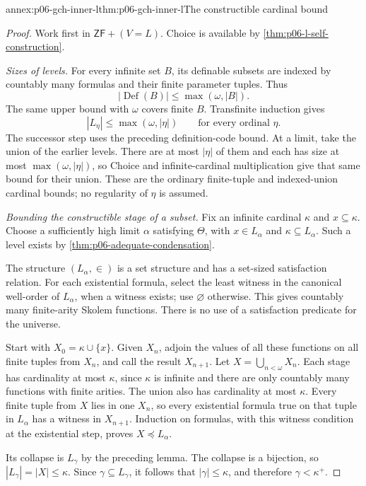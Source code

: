 \begin{annexitem}{annex:p06-gch-inner-l}{thm:p06-gch-inner-l}{The constructible cardinal bound}
\begin{proof}
Work first in \(\mathsf{ZF}+(V=L)\).
Choice is available by
\cref{thm:p06-l-self-construction}.

\emph{Sizes of levels.}
For every infinite set \(B\),
its definable subsets are indexed by countably many
formulas and their finite parameter tuples.
Thus
\[
 |\operatorname{Def}(B)|\leq
 \max(\omega,|B|).
\]
The same upper bound with \(\omega\) covers finite \(B\).
Transfinite induction gives
\[
 |L_\eta|\leq\max(\omega,|\eta|)
 \qquad\text{for every ordinal }\eta.
\]
The successor step uses the preceding definition-code bound.
At a limit, take the union of the earlier levels.
There are at most \(|\eta|\) of them and each has size at
most \(\max(\omega,|\eta|)\), so Choice and infinite-cardinal
multiplication give that same bound for their union.
These are the ordinary finite-tuple and indexed-union cardinal
bounds; no regularity of \(\eta\) is assumed.

\emph{Bounding the constructible stage of a subset.}
Fix an infinite cardinal \(\kappa\) and \(x\subseteq\kappa\).
Choose a sufficiently high limit \(\alpha\) satisfying
\(\Theta\), with \(x\in L_\alpha\) and
\(\kappa\subseteq L_\alpha\).
Such a level exists by
\cref{thm:p06-adequate-condensation}.

The structure \((L_\alpha,\in)\) is a set structure and
has a set-sized satisfaction relation.
For each existential formula, select the least witness
in the canonical well-order of \(L_\alpha\), when a
witness exists; use \(\varnothing\) otherwise.
This gives countably many finite-arity Skolem functions.
There is no use of a satisfaction predicate for the universe.

Start with \(X_0=\kappa\cup\{x\}\).
Given \(X_n\), adjoin the values of all these functions
on all finite tuples from \(X_n\), and call the result
\(X_{n+1}\).
Let \(X=\bigcup_{n<\omega}X_n\).
Each stage has cardinality at most \(\kappa\), since
\(\kappa\) is infinite and there are only countably
many functions with finite arities.
The union also has cardinality at most \(\kappa\).
Every finite tuple from \(X\) lies in one \(X_n\), so
every existential formula true on that tuple in
\(L_\alpha\) has a witness in \(X_{n+1}\).
Induction on formulas, with this witness condition at
the existential step, proves \(X\preccurlyeq L_\alpha\).

Its collapse is \(L_\gamma\) by the preceding lemma.
The collapse is a bijection, so
\(|L_\gamma|=|X|\leq\kappa\).
Since \(\gamma\subseteq L_\gamma\), it follows that
\(|\gamma|\leq\kappa\), and therefore \(\gamma<\kappa^+\).


\end{proof}
\end{annexitem}
